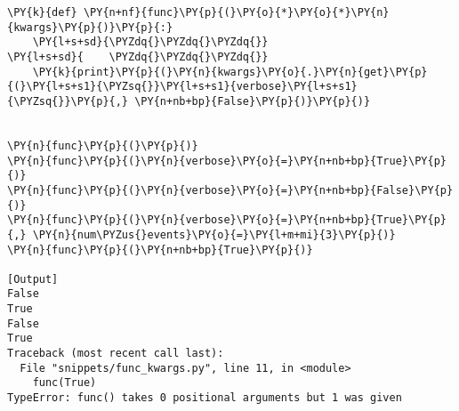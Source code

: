 \begin{Verbatim}[label=\makebox{\url{https://bitbucket.org/lbaldini/programming/src/tip/snippets/func\_kwargs.py}},commandchars=\\\{\}]
\PY{k}{def} \PY{n+nf}{func}\PY{p}{(}\PY{o}{*}\PY{o}{*}\PY{n}{kwargs}\PY{p}{)}\PY{p}{:}
    \PY{l+s+sd}{\PYZdq{}\PYZdq{}\PYZdq{}}
\PY{l+s+sd}{    \PYZdq{}\PYZdq{}\PYZdq{}}
    \PY{k}{print}\PY{p}{(}\PY{n}{kwargs}\PY{o}{.}\PY{n}{get}\PY{p}{(}\PY{l+s+s1}{\PYZsq{}}\PY{l+s+s1}{verbose}\PY{l+s+s1}{\PYZsq{}}\PY{p}{,} \PY{n+nb+bp}{False}\PY{p}{)}\PY{p}{)}


\PY{n}{func}\PY{p}{(}\PY{p}{)}
\PY{n}{func}\PY{p}{(}\PY{n}{verbose}\PY{o}{=}\PY{n+nb+bp}{True}\PY{p}{)}
\PY{n}{func}\PY{p}{(}\PY{n}{verbose}\PY{o}{=}\PY{n+nb+bp}{False}\PY{p}{)}
\PY{n}{func}\PY{p}{(}\PY{n}{verbose}\PY{o}{=}\PY{n+nb+bp}{True}\PY{p}{,} \PY{n}{num\PYZus{}events}\PY{o}{=}\PY{l+m+mi}{3}\PY{p}{)}
\PY{n}{func}\PY{p}{(}\PY{n+nb+bp}{True}\PY{p}{)}

[Output]
False
True
False
True
Traceback (most recent call last):
  File "snippets/func_kwargs.py", line 11, in <module>
    func(True)
TypeError: func() takes 0 positional arguments but 1 was given
\end{Verbatim}